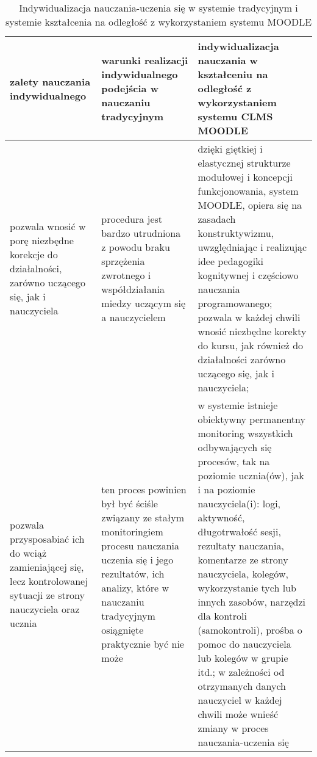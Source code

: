 		\begin{table}[!h]
		\centering
		\caption[c.d. Indywidualizacja nauczania ]{Indywidualizacja nauczania-uczenia się w systemie tradycyjnym i systemie kształcenia na odległość z wykorzystaniem systemu MOODLE}
		\label{tab:cd_indywidualnego}
		\begin{tabular}{|p{4cm}|p{5.5cm}|p{7.5cm}|} \hline
			\textbf{zalety nauczania indywidualnego} & \textbf{warunki realizacji indywidualnego podejścia w nauczaniu tradycyjnym} & \textbf{indywidualizacja nauczania w kształceniu na odległość z wykorzystaniem systemu CLMS MOODLE} \\ \hline
			pozwala wnosić w porę niezbędne korekcje do działalności, zarówno uczącego się, jak i nauczyciela & procedura jest bardzo utrudniona z powodu braku sprzężenia zwrotnego i współdziałania miedzy uczącym się a nauczycielem & dzięki giętkiej i elastycznej strukturze modułowej i koncepcji funkcjonowania, system MOODLE, opiera się na zasadach konstruktywizmu, uwzględniając i realizując idee pedagogiki kognitywnej i częściowo nauczania programowanego; pozwala w każdej chwili wnosić niezbędne korekty do kursu, jak również do działalności zarówno uczącego się, jak i nauczyciela; \\ \hline
		pozwala przysposabiać ich do wciąż zamieniającej się, lecz kontrolowanej sytuacji ze strony nauczyciela oraz ucznia & ten proces powinien był być ściśle związany ze stałym monitoringiem procesu nauczania uczenia się i jego rezultatów, ich analizy, które w nauczaniu tradycyjnym osiągnięte praktycznie być nie może & w systemie istnieje obiektywny permanentny monitoring wszystkich odbywających się procesów, tak na poziomie ucznia(ów), jak i na poziomie nauczyciela(i): logi, aktywność, długotrwałość sesji, rezultaty nauczania, komentarze ze strony nauczyciela, kolegów, wykorzystanie tych lub innych zasobów, narzędzi dla kontroli (samokontroli), prośba o pomoc do nauczyciela lub kolegów w grupie itd.; w zależności od otrzymanych danych nauczyciel w każdej chwili może wnieść zmiany w proces nauczania-uczenia się \\ \hline
		\end{tabular}
		\end{table}
